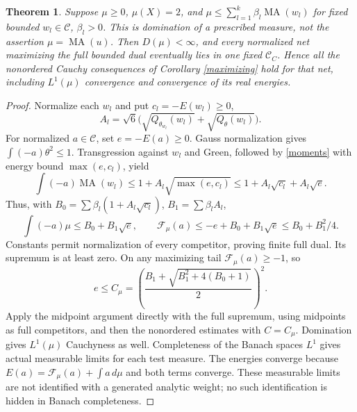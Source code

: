 \documentclass[11pt]{article}
\newcommand{\MA}{\operatorname{MA}}
\newcommand{\C}{\mathcal C}
\newtheorem{theorem}{Theorem}
\theoremstyle{remark}\newtheorem{remark}[theorem]{Remark}
\begin{document}
\begin{theorem}\label{coercive}
Suppose $\mu\ge0$, $\mu(X)=2$, and
$\mu\le\sum_{l=1}^k\beta_l\MA(w_l)$ for fixed bounded
$w_l\in\C$, $\beta_l>0$. This is domination of a prescribed
measure, not the assertion $\mu=\MA(u)$. Then $D(\mu)<\infty$,
and every normalized net maximizing the \emph{full} bounded dual
eventually lies in one fixed $\C_C$. Hence all the nonordered
Cauchy consequences of Corollary \ref{maximizing} hold for that net,
including $L^1(\mu)$ convergence and convergence of its real energies.
\end{theorem}
\begin{proof}
Normalize each $w_l$ and put $c_l=-E(w_l)\ge0$,
\[
 A_l=\sqrt6\bigl(\sqrt{Q_{\theta_{w_l}}(w_l)}+
                         \sqrt{Q_\theta(w_l)}\bigr).
\]
For normalized $a\in\C$, set $e=-E(a)\ge0$.
Gauss normalization gives $\int(-a)\theta^2\le1$.
Transgression against $w_l$ and Green, followed by \eqref{moments}
with energy bound $\max(e,c_l)$, yield
\[
 \int(-a)\MA(w_l)\le1+A_l\sqrt{\max(e,c_l)}
 \le1+A_l\sqrt{c_l}+A_l\sqrt e.
\]
Thus, with $B_0=\sum\beta_l(1+A_l\sqrt{c_l})$,
$B_1=\sum\beta_l A_l$,
\[
 \int(-a)\mu\le B_0+B_1\sqrt e,\qquad
 \mathcal F_\mu(a)\le-e+B_0+B_1\sqrt e
 \le B_0+B_1^2/4.
\]
Constants permit normalization of every competitor, proving finite
full dual. Its supremum is at least zero. On any maximizing tail
$\mathcal F_\mu(a)\ge-1$, so
\[
 e\le C_\mu=\left(\frac{B_1+
                \sqrt{B_1^2+4(B_0+1)}}2\right)^2.
\]
Apply the midpoint argument directly with the full supremum, using
midpoints as full competitors, and then the nonordered estimates
with $C=C_\mu$. Domination gives $L^1(\mu)$ Cauchyness as well.
Completeness of the Banach spaces $L^1$ gives actual measurable
limits for each test measure. The energies converge because
$E(a)=\mathcal F_\mu(a)+\int a\,d\mu$ and both terms converge.
These measurable limits are not identified with a generated analytic
weight; no such identification is hidden in Banach completeness.
\end{proof}
\end{document}

